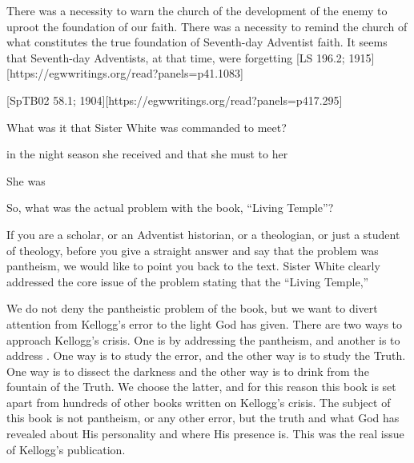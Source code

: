 There was a necessity to warn the church of the development of the enemy to uproot the foundation of our faith. There was a necessity to remind the church of what constitutes the true foundation of Seventh-day Adventist faith. It seems that Seventh-day Adventists, at that time, were forgetting [LS 196.2; 1915][https://egwwritings.org/read?panels=p41.1083]

[SpTB02 58.1; 1904][https://egwwritings.org/read?panels=p417.295]

What was it that Sister White was commanded to meet?

 in the night season she received  and that she must  to her 

She was 

So, what was the actual problem with the book, “Living Temple”?

If you are a scholar, or an Adventist historian, or a theologian, or just a student of theology, before you give a straight answer and say that the problem was pantheism, we would like to point you back to the text. Sister White clearly addressed the core issue of the problem stating that the “Living Temple,” 

We do not deny the pantheistic problem of the book, but we want to divert attention from Kellogg’s error to the light God has given. There are two ways to approach Kellogg’s crisis. One is by addressing the pantheism, and another is to address . One way is to study the error, and the other way is to study the Truth. One way is to dissect the darkness and the other way is to drink from the fountain of the Truth. We choose the latter, and for this reason this book is set apart from hundreds of other books written on Kellogg’s crisis. The subject of this book is not pantheism, or any other error, but the truth and what God has revealed about His personality and where His presence is. This was the real issue of Kellogg’s publication. 


